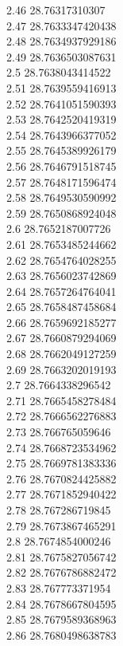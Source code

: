 {2.46	28.76317310307\\
2.47	28.7633347420438\\
2.48	28.7634937929186\\
2.49	28.7636503087631\\
2.5	28.7638043414522\\
2.51	28.7639559416913\\
2.52	28.7641051590393\\
2.53	28.7642520419319\\
2.54	28.7643966377052\\
2.55	28.7645389926179\\
2.56	28.7646791518745\\
2.57	28.7648171596474\\
2.58	28.7649530590992\\
2.59	28.7650868924048\\
2.6	28.7652187007726\\
2.61	28.7653485244662\\
2.62	28.7654764028255\\
2.63	28.7656023742869\\
2.64	28.7657264764041\\
2.65	28.7658487458684\\
2.66	28.7659692185277\\
2.67	28.7660879294069\\
2.68	28.7662049127259\\
2.69	28.7663202019193\\
2.7	28.7664338296542\\
2.71	28.7665458278484\\
2.72	28.7666562276883\\
2.73	28.766765059646\\
2.74	28.7668723534962\\
2.75	28.7669781383336\\
2.76	28.7670824425882\\
2.77	28.7671852940422\\
2.78	28.767286719845\\
2.79	28.7673867465291\\
2.8	28.7674854000246\\
2.81	28.7675827056742\\
2.82	28.7676786882472\\
2.83	28.767773371954\\
2.84	28.7678667804595\\
2.85	28.7679589368963\\
2.86	28.7680498638783\\
}
